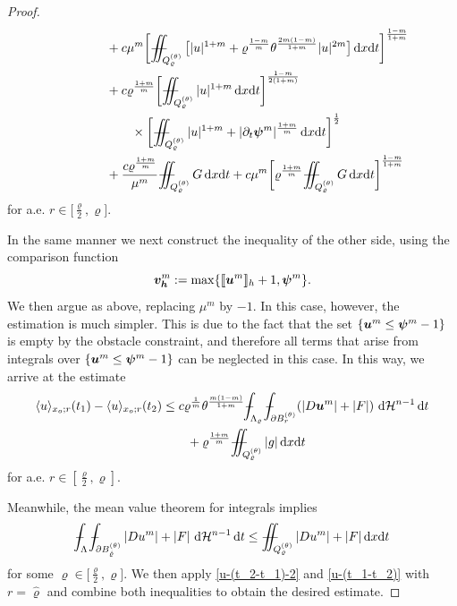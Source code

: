 \documentclass[a4paper, 10pt, american]{amsart}
\numberwithin{theorem}{section}
\numberwithin{equation}{section}
\newcommand{\dxdt}{\,\mathrm{d}x\mathrm{d}t}
\renewcommand{\d}{\,\mathrm{d}}
\newcommand{\dt}{\,\mathrm{d}t}
\renewcommand{\rho}{\varrho}
\newcommand{\power}[2]{\bm{#1^{\mbox{\unboldmath{\scriptsize$#2$}}}}}
\def\Xint#1{\mathchoice
    {\XXint\displaystyle\textstyle{#1}}%
    {\XXint\textstyle\scriptstyle{#1}}%
    {\XXint\scriptstyle\scriptscriptstyle{#1}}%
    {\XXint\scriptscriptstyle\scriptscriptstyle{#1}}%
    \!\int}
\def\XXint#1#2#3{\setbox0=\hbox{$#1{#2#3}{\int}$}
    \vcenter{\hbox{$#2#3$}}\kern-0.5\wd0}
\def\bint{\Xint-}
\def\Xiint#1{\mathchoice
    {\XXiint\displaystyle\textstyle{#1}}%
    {\XXiint\textstyle\scriptstyle{#1}}%
    {\XXiint\scriptstyle\scriptscriptstyle{#1}}%
    {\XXiint\scriptscriptstyle\scriptscriptstyle{#1}}%
    \!\iint}
\def\XXiint#1#2#3{\setbox0=\hbox{$#1{#2#3}{\iint}$}
    \vcenter{\hbox{$#2#3$}}\kern-0.5\wd0}
\def\biint{\Xiint{-\!-}}
\def\<{\langle}
\def\>{\rangle}
\begin{document}
\begin{proof}
\begin{align}
&\qquad\qquad+
c\mu^m\bigg[\biint_{Q_\rho^{(\theta)}}\big[ |u|^{1+m} 
+
\rho^{\frac{1-m}m}\theta^{\frac{2m(1-m)}{1+m}} |u|^{2m} \big]\dxdt\bigg]^{\frac{1-m}{1+m}}  \\\nonumber
&\qquad\qquad+
c\rho^{\frac{1+m}m}\bigg[\biint_{Q_\rho^{(\theta)}} |u|^{1+m} \dxdt \bigg]^{\frac{1-m}{2(1+m)}} \\\nonumber
&\qquad\qquad\qquad\times
\bigg[\biint_{Q_\rho^{(\theta)}}|u|^{1+m}+ |\partial_t \power \psi m|^{\frac{1+m}m} \dxdt\bigg]^{\frac12} \\
&\qquad\qquad+
  \frac{c\rho^{\frac{1+m}m}}{\mu^m}
  \biint_{Q_\rho^{(\theta)}}
  G\dxdt
+
c\mu^m\bigg[\rho^{\frac{1+m}m}\biint_{Q_{\rho}^{(\theta)}} G
\dxdt\bigg]^{\frac{1-m}{1+m}}
\end{align}
for a.e. $r\in\big[ \frac\rho2, \rho \big]$.

In the same manner we next construct the inequality of the other side, using the comparison function
\begin{equation*}
  \power{v_h}{m}:=\max\{\llbracket
  \power{u}{m}\rrbracket_h+1,\power{\psi}{m}\}.
\end{equation*}
We then argue as above, replacing $\mu^m$ by $-1$. In this case,
however, the estimation is much simpler. This is due to the fact that 
the set $\{\power um\le\power \psi m-1\}$ is empty by
the obstacle constraint, and therefore all terms that arise from  
integrals over $\{\power um\le\power \psi m-1\}$ can be
neglected in this case. 
In this way, we arrive at the estimate
\begin{align}\label{u-(t_1-t_2)}\nonumber
\<u\>_{x_o;r}(t_1)-\<u\>_{x_o;r}(t_2)
  &\le
  c\rho^{\frac1m}\theta^{\frac{m(1-m)}{1+m}}\bint_{\Lambda_\rho}\bint_{\partial B_r^{(\theta)}}(|D\power um| + |F|)\,\d\mathcal{H}^{n-1}\dt \\
  &\qquad+
 \rho^{\frac{1+m}m} \biint_{Q_\rho^{(\theta)}} |g| \dxdt
\end{align}
for a.e. $r\in[\frac\rho2, \rho]$.

Meanwhile, the mean value theorem for integrals implies
\begin{align}
\bint_{\Lambda}\bint_{\partial B_{\hat{\rho}}^{(\theta)}} |Du^m|+|F|\,\d\mathcal{H}^{n-1}\dt 
\le
\biint_{Q_\rho^{(\theta)}} |Du^m|+|F|\dxdt
\end{align}
for some $\hat{\rho}\in\big[ \frac\rho2 , \rho \big]$.
We then apply \eqref{u-(t_2-t_1)-2} and \eqref{u-(t_1-t_2)} with $r=\hat{\rho}$ and combine both inequalities to obtain the desired estimate.
\end{proof}
\end{document}
